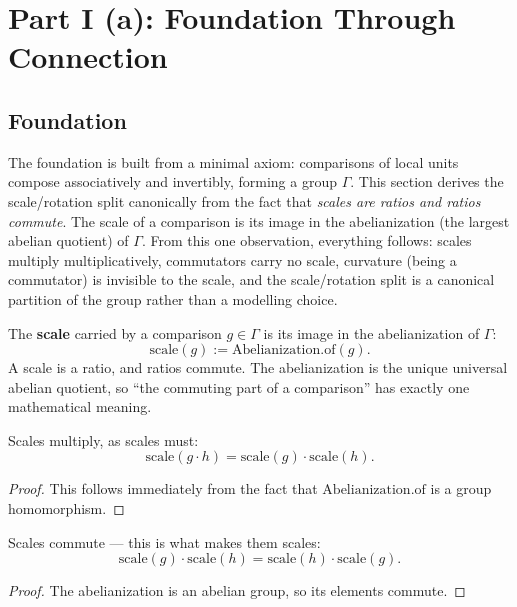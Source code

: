 \section{Part I (a): Foundation Through Connection}

\subsection{Foundation}

The foundation is built from a minimal axiom: comparisons of local units compose associatively and invertibly, forming a group $\Gamma$. This section derives the scale/rotation split canonically from the fact that \emph{scales are ratios and ratios commute}. The scale of a comparison is its image in the abelianization (the largest abelian quotient) of $\Gamma$. From this one observation, everything follows: scales multiply multiplicatively, commutators carry no scale, curvature (being a commutator) is invisible to the scale, and the scale/rotation split is a canonical partition of the group rather than a modelling choice.

\begin{definition}
The \textbf{scale} carried by a comparison $g \in \Gamma$ is its image in the abelianization of $\Gamma$:
\[
\text{scale}(g) := \text{Abelianization.of}(g).
\]
A scale is a ratio, and ratios commute. The abelianization is the unique universal abelian quotient, so ``the commuting part of a comparison'' has exactly one mathematical meaning.
\end{definition}

\begin{theorem}
Scales multiply, as scales must:
\[
\text{scale}(g \cdot h) = \text{scale}(g) \cdot \text{scale}(h).
\]
\begin{proof}
This follows immediately from the fact that $\text{Abelianization.of}$ is a group homomorphism.
\end{proof}
\end{theorem}

\begin{theorem}
Scales commute — this is what makes them scales:
\[
\text{scale}(g) \cdot \text{scale}(h) = \text{scale}(h) \cdot \text{scale}(g).
\]
\begin{proof}
The abelianization is an abelian group, so its elements commute.
\end{proof}
\end{theorem}

